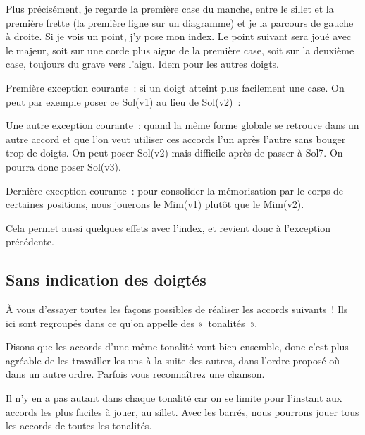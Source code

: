 \documentclass[11pt]{article}
\begin{document}

Plus précisément, je regarde la première case du manche, entre le sillet
et la première frette (la première ligne sur un
diagramme) et je la parcours de gauche à droite. Si je vois un point,
j’y pose mon index. Le point suivant sera joué avec le majeur, soit
sur une corde plus aigue de la première case, soit sur la deuxième case,
toujours du grave vers l’aigu. Idem pour les autres doigts.

Première exception courante~: si un doigt atteint plus facilement une case.
On peut par exemple poser ce Sol(v1) au lieu de Sol(v2)~:


Une autre exception courante~: quand la même forme globale se retrouve dans un
autre accord et que l’on veut utiliser ces accords l’un après l’autre sans
bouger trop de doigts. On peut poser Sol(v2) mais difficile après de passer à
Sol7. On pourra donc poser Sol(v3).


Dernière exception courante~: pour consolider la mémorisation par le corps de
certaines positions, nous jouerons le Mim(v1) plutôt que le Mim(v2).


Cela permet aussi quelques effets avec l’index, et revient donc à l’exception
précédente.

\subsection{Sans indication des doigtés}

À vous d’essayer toutes les façons possibles de réaliser les accords
suivants~! Ils ici sont regroupés dans ce qu’on appelle des «~tonalités~».

Disons que les accords d’une même tonalité vont bien ensemble, donc
c’est plus agréable de les travailler les uns à la suite des autres, dans
l’ordre proposé où dans un autre ordre. Parfois vous reconnaîtrez une chanson.

Il n’y en a pas autant dans chaque tonalité car on se limite pour l’instant aux
accords les plus faciles à jouer, au sillet. Avec les barrés, nous pourrons
jouer tous les accords de toutes les tonalités.
\end{document}
